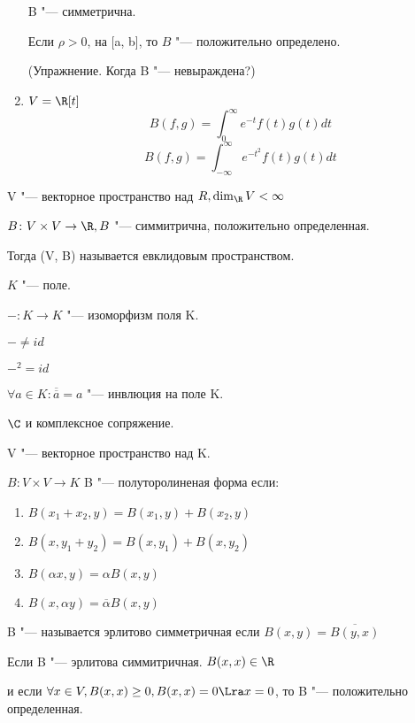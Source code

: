 \begin{exmp}
\begin{enumerate}
B "--- симметрична.

Если $\rho > 0$, на [a, b], то $B$ "--- положительно определено. 

(Упражнение. Когда B "--- невыраждена?)
\item $V = \R[t]$
$$B(f, g) = \int_{0}^{\infty}e^{-t}f(t)g(t)dt$$
$$B(f, g) = \int_{-\infty}^{\infty}e^{-t^2}f(t)g(t)dt$$
\end{enumerate}     
\end{exmp}

\begin{Def}
V "--- векторное пространство над $R, \dim_{\R}V < \infty$

$B \colon V \times V \to \R, B$ "--- симмитрична, положительно определенная.

Тогда (V, B) называется евклидовым пространством. 
\end{Def}

\begin{Def}
$K$ "--- поле.

$-\colon K \to K$ "--- изоморфизм поля K.

$- \ne id$

$-^2 = id$

$\forall a \in K\colon \overline{\overline{a}} = a$ "--- инвлюция на поле K.
\end{Def}

\begin{exmp}
$\C$ и комплексное сопряжение. 
\end{exmp}

\begin{Def}
V "--- векторное пространство над K. 

$B\colon V \times V \to K$  B "--- полуторолиненая форма если:

\begin{enumerate}
\item $B(x_1 + x_2, y) = B(x_1, y) + B(x_2, y)$
\item $B(x, y_1 + y_2) = B(x, y_1) + B(x, y_2)$
\item $B(\alpha x, y) = \alpha B(x, y)$
\item $B(x, \alpha y) = \overline{\alpha}B(x, y)$
\end{enumerate}
\end{Def}

\begin{Def}
B "--- называется эрлитово симметричная если 
$B(x, y) = \overline{B(y, x)}$
\end{Def}

\begin{Def}
Если B "--- эрлитова симмитричная.
$B(x, x) \in \R$

и если $\forall x \in V, B(x, x) \ge 0, B(x, x) = 0 \Lra x = 0$, то B "--- 
положительно определенная. 
\end{Def}

